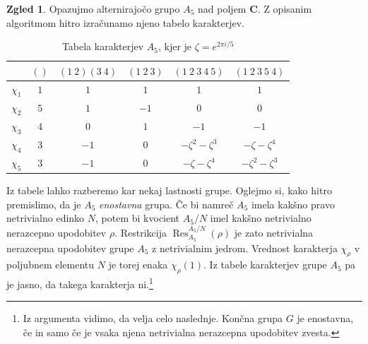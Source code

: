 \documentclass[11pt]{book}
\def\CC{\mathbf{C}}
\DeclareMathOperator\Res{Res}
\theoremstyle{definition}
\theoremstyle{zgled}
\newtheorem{zgled}[theorem]{Zgled}
\theoremstyle{zgledbrezstevilke}
\theoremstyle{odprtproblem}
\theoremstyle{domacanaloga}
\theoremstyle{izrek}
\begin{document}
\begin{zgled}
Opazujmo alternirajočo grupo $A_5$ nad poljem $\CC$. Z opisanim algoritmom hitro izračunamo njeno tabelo karakterjev.

\begin{table}[t]
    \centering
\begin{tabular}{c|ccccc}
    & $()$ & $(1 \ 2)(3 \ 4)$ & $(1 \ 2 \ 3)$ & $(1 \ 2 \ 3 \ 4 \ 5)$ & $(1 \ 2 \ 3 \ 5 \ 4)$ \\ \hline
    $\chi_1$ & $1$ & $1$ & $1$ & $1$ & $1$ \\
    $\chi_2$ & $5$ & $1$ & $-1$ & $0$ & $0$ \\
    $\chi_3$ & $4$ & $0$ & $1$ & $-1$ & $-1$ \\
    $\chi_4$ & $3$ & $-1$ & $0$ & $-\zeta^2-\zeta^3$ & $-\zeta-\zeta^4$ \\
    $\chi_5$ & $3$ & $-1$ & $0$ & $-\zeta-\zeta^4$ & $-\zeta^2-\zeta^3$ \\
\end{tabular}
\caption{Tabela karakterjev $A_5$, kjer je $\zeta = e^{2 \pi i / 5}$}
\end{table}

Iz tabele lahko razberemo kar nekaj lastnosti grupe. Oglejmo si, kako hitro premislimo, da je $A_5$ \emph{enostavna} grupa. Če bi namreč $A_5$ imela kakšno pravo netrivialno edinko $N$, potem bi kvocient $A_5/N$ imel kakšno netrivialno nerazcepno upodobitev $\rho$. Restrikcija $\Res^{A_5/N}_{A_5}(\rho)$ je zato netrivialna nerazcepna upodobitev grupe $A_5$ z netrivialnim jedrom. Vrednost karakterja $\chi_{\rho}$ v poljubnem elementu $N$ je torej enaka $\chi_{\rho}(1)$. Iz tabele karakterjev grupe $A_5$ pa je jasno, da takega karakterja ni.\footnote{Iz argumenta vidimo, da velja celo naslednje. Končna grupa $G$ je enostavna, če in samo če je vsaka njena netrivialna nerazcepna upodobitev zvesta.}
\end{zgled}
\end{document}
